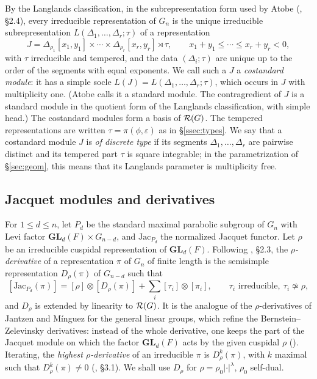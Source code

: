 \documentclass[a4paper,12pt,leqno]{amsart}
\theoremstyle{plain}
\theoremstyle{definition}
\begin{document}
By the Langlands classification, in the subrepresentation form used by Atobe (\cite{Ato24}, \S2.4),
every irreducible representation of $G_n$ is the unique irreducible subrepresentation
$L(\Delta_1,\ldots,\Delta_r;\tau)$ of a representation
\[J=\Delta_{\rho_1}[x_1,y_1]\times\cdots\times\Delta_{\rho_r}[x_r,y_r]\rtimes\tau,\qquad
x_1+y_1\leq\cdots\leq x_r+y_r<0,\]
with $\tau$ irreducible and tempered, and the data $(\Delta_i;\tau)$ are unique up to the order of
the segments with equal exponents. We call such a $J$ a \emph{costandard module}: it has a simple
socle $L(J)=L(\Delta_1,\ldots,\Delta_r;\tau)$, which occurs in $J$ with multiplicity one. (Atobe calls
it a standard module. The contragredient of $J$ is a standard module in the quotient form of the
Langlands classification, with simple head.) The costandard modules form a basis of $\mathcal{R}(G)$. The
tempered representations are written $\tau=\pi(\phi,\varepsilon)$ as in \S\ref{ssec:types}. We say
that a costandard module $J$ is \emph{of discrete type} if its segments $\Delta_1,\ldots,\Delta_r$ are
pairwise distinct and its tempered part $\tau$ is square integrable; in the parametrization of
\S\ref{sec:geom}, this means that its Langlands parameter is multiplicity free.

\subsection{Jacquet modules and derivatives}\label{ssec:deriv}
For $1\leq d\leq n$, let $P_d$ be the standard maximal parabolic subgroup of $G_n$ with Levi factor
$\mathbf{GL}_d(F)\times G_{n-d}$, and $\mathrm{Jac}_{P_d}$ the normalized Jacquet functor. Let $\rho$ be
an irreducible cuspidal representation of $\mathbf{GL}_d(F)$. Following \cite{Ato24}, \S2.3, the
\emph{$\rho$-derivative} of a representation $\pi$ of $G_n$ of finite length is the semisimple
representation $D_\rho(\pi)$ of $G_{n-d}$ such that
\[[\mathrm{Jac}_{P_d}(\pi)]=[\rho]\otimes[D_\rho(\pi)]+\sum_i[\tau_i]\otimes[\pi_i],\qquad
\tau_i\text{ irreducible},\ \tau_i\not\simeq\rho,\]
and $D_\rho$ is extended by linearity to $\mathcal{R}(G)$. It is the analogue of the $\rho$-derivatives of
Jantzen and M\'inguez for the general linear groups, which refine the Bernstein--Zelevinsky
derivatives: instead of the whole derivative, one keeps the part of the Jacquet module on which the
factor $\mathbf{GL}_d(F)$ acts by the given cuspidal $\rho$ (\cite{Jan07}). Iterating, the
\emph{highest $\rho$-derivative} of an irreducible $\pi$ is $D_\rho^{k}(\pi)$, with $k$ maximal such
that $D_\rho^{k}(\pi)\neq0$ (\cite{AM23}, \S3.1). We shall use $D_\rho$ for $\rho=\rho_0|\cdot|^\lambda$, $\rho_0$ self-dual.
\end{document}
